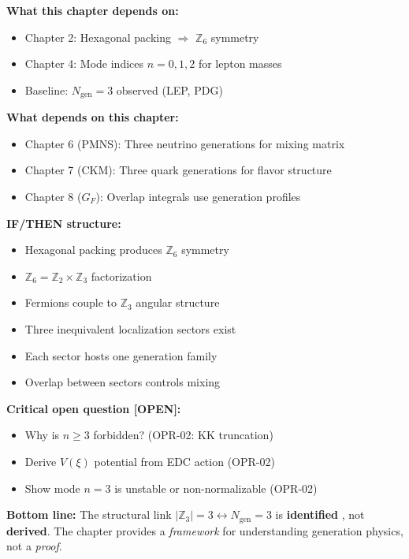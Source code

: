 \begin{tcolorbox}[colback=gray!5!white, colframe=gray!60!black,
    title=\textbf{Dependency Map \& Status (IF/THEN)}]
\textbf{What this chapter depends on:}
\begin{itemize}[nosep]
    \item Chapter 2: Hexagonal packing $\Rightarrow$ $\mathbb{Z}_6$ symmetry \tagDc{}
    \item Chapter 4: Mode indices $n = 0, 1, 2$ for lepton masses \tagI{}
    \item Baseline: $N_{\text{gen}} = 3$ observed (LEP, PDG) \tagBL{}
\end{itemize}

\textbf{What depends on this chapter:}
\begin{itemize}[nosep]
    \item Chapter 6 (PMNS): Three neutrino generations for mixing matrix
    \item Chapter 7 (CKM): Three quark generations for flavor structure
    \item Chapter 8 ($G_F$): Overlap integrals use generation profiles
\end{itemize}

\textbf{IF/THEN structure:}
\begin{itemize}[nosep]
    \item[\textbf{IF}] Hexagonal packing produces $\mathbb{Z}_6$ symmetry \tagDc{}
    \item[\textbf{AND}] $\mathbb{Z}_6 = \mathbb{Z}_2 \times \mathbb{Z}_3$ factorization \tagM{}
    \item[\textbf{AND}] Fermions couple to $\mathbb{Z}_3$ angular structure \tagP{}
    \item[\textbf{THEN}] Three inequivalent localization sectors exist \tagI{}
    \item[\textbf{AND}] Each sector hosts one generation family \tagI{}
    \item[\textbf{AND}] Overlap between sectors controls mixing \tagI{}
\end{itemize}

\textbf{Critical open question [OPEN]:}
\begin{itemize}[nosep]
    \item[$\circ$] Why is $n \geq 3$ forbidden? (OPR-02: KK truncation)
    \item[$\circ$] Derive $V(\xi)$ potential from EDC action (OPR-02)
    \item[$\circ$] Show mode $n = 3$ is unstable or non-normalizable (OPR-02)
\end{itemize}

\textbf{Bottom line:}
The structural link $|\mathbb{Z}_3| = 3 \leftrightarrow N_{\text{gen}} = 3$ is
\textbf{identified} \tagI{}, not \textbf{derived}. The chapter provides a
\emph{framework} for understanding generation physics, not a \emph{proof}.
\end{tcolorbox}


